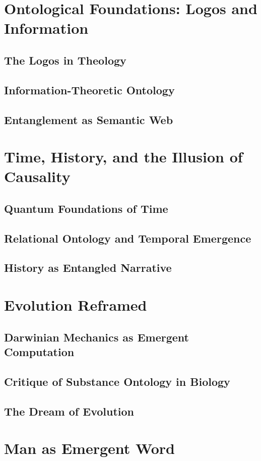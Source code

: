 \documentclass[12pt]{article}
\begin{document}
\section{Ontological Foundations: Logos and Information}
\subsection{The Logos in Theology}
\subsection{Information-Theoretic Ontology}
\subsection{Entanglement as Semantic Web}

\section{Time, History, and the Illusion of Causality}
\subsection{Quantum Foundations of Time}
\subsection{Relational Ontology and Temporal Emergence}
\subsection{History as Entangled Narrative}

\section{Evolution Reframed}
\subsection{Darwinian Mechanics as Emergent Computation}
\subsection{Critique of Substance Ontology in Biology}
\subsection{The Dream of Evolution}

\section{Man as Emergent Word}
\end{document}
